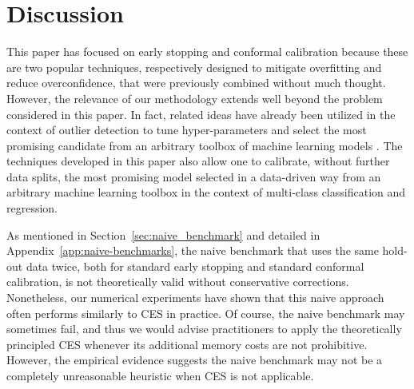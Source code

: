

\section{Discussion} \label{sec:discussion}

This paper has focused on early stopping and conformal calibration because these are two popular techniques, respectively designed to mitigate overfitting and reduce overconfidence, that were previously combined without much thought. However, the relevance of our methodology extends well beyond the problem considered in this paper.
In fact, related ideas have already been utilized in the context of outlier detection to tune hyper-parameters and select the most promising candidate from an arbitrary toolbox of machine learning models \citep{Liang_2022_integrative_p_val}.
The techniques developed in this paper also allow one to calibrate, without further data splits, the most promising model selected in a data-driven way from an arbitrary machine learning toolbox in the context of multi-class classification and regression.

As mentioned in Section~\ref{sec:naive_benchmark} and detailed in Appendix~\ref{app:naive-benchmarks}, the naive benchmark that uses the same hold-out data twice, both for standard early stopping and standard conformal calibration, is not theoretically valid without conservative corrections. Nonetheless, our numerical experiments have shown that this naive approach often performs similarly to CES in practice.
Of course, the naive benchmark may sometimes fail, and thus we would advise practitioners to apply the theoretically principled CES whenever its additional memory costs are not prohibitive. However, the empirical evidence suggests the naive benchmark may not be a completely unreasonable heuristic when CES is not applicable.


